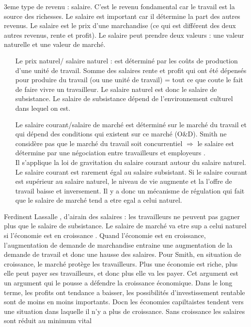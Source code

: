 \documentclass{article}
\begin{document}
3eme type de revenu : salaire. C'est le revenu fondamental car le travail est la source des richesses. Le salaire est important car il détermine la part des autres revenus. Le salaire est le prix d'une marchandise (ce qui est différent des deux autres revenus, rente et profit). Le salaire peut prendre deux valeurs : une valeur naturelle et une valeur de marché.
\begin{itemize}
	\item[Le prix naturel/ salaire naturel] : est déterminé par les coûts de production d'une unité de travail. Somme des salaires rente et profit qui ont été dépensés pour produire du travail (ou une unité de travail) = tout ce que coute le fait de faire vivre un travailleur. Le salaire naturel est donc le salaire de subsistance. Le salaire de subsistance dépend de l'environnement culturel dans lequel on est.
	\item[Le salaire courant/salaire de marché] est déterminé sur le marché du travail et qui dépend des conditions qui existent sur ce marché (O&D). Smith ne considère pas que le marché du travail soit concurrentiel $\Rightarrow$ le salaire est détermine par une négociation entre travailleurs et employeurs . \\
	Il s'applique la loi de gravitation du salaire courant autour du salaire naturel. Le salaire courant est rarement égal au salaire subsistant. Si le salaire courant est supérieur au salaire naturel, le niveau de vie augmente et la l'offre de travail baisse et inversement. Il y a donc un mécanisme de régulation qui fait que le salaire de marché tend a etre egal a celui naturel.
\end{itemize}
Ferdinent Lassalle , d'airain des salaires : les travailleurs ne peuvent pas gagner plus que le salaire de subsistance. Le salaire de marché va etre sup a celui naturel si l'économie est en croissance . Quand l'économie est en croissance, l'augmentation de demande de marchandise entraine une augmentation de la demande de travail et donc une hausse des salaires. Pour Smith, en situation de croissance, le marché protège les travailleurs. Plus une économie est riche, plus elle peut payer ses travailleurs, et donc plus elle va les payer.
Cet argument est un argument qui le pousse a défendre la croissance économique.
Dans le long terme, les profits ont tendance a baisser, les possibilités d'investissement rentable sont de moins en moins importants. Docn les économies capiltaistes tendent vers une situation dans laquelle il n'y a plus de croissance. Sans croissance les salaires sont réduit au minimum vital
\end{document}

